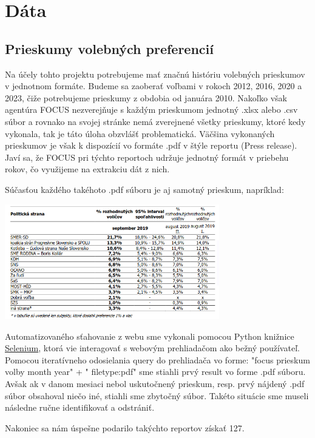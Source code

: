 \documentclass[main.tex]{subfiles}
\begin{document}
\section{Dáta}

\subsection{Prieskumy volebných preferencií}
Na účely tohto projektu potrebujeme mať značnú históriu volebných prieskumov v jednotnom formáte. Budeme sa zaoberať voľbami v rokoch 2012, 2016, 2020 a 2023, čiže potrebujeme prieskumy z obdobia od januára 2010.
Nakoľko však agentúra FOCUS nezverejňuje s každým prieskumom jednotný .xlsx alebo .csv súbor a rovnako na svojej stránke nemá zverejnené všetky prieskumy, ktoré kedy vykonala, tak je táto úloha obzvlášť problematická.
Väčšina vykonaných prieskumov je však k dispozícií vo formáte .pdf v štýle reportu (Press release). Javí sa, že FOCUS pri týchto reportoch udržuje jednotný formát v priebehu rokov, čo využijeme na extrakciu dát z nich.

Súčasťou každého takéhoto .pdf súboru je aj samotný prieskum, napríklad:

\begin{center}
\includegraphics[width=0.7\textwidth]{figs/priklad-focus-prieskumu.png}
\end{center}

Automatizovaného sťahovanie z webu sme vykonali pomocou Python knižnice \href{https://github.com/SeleniumHQ/Selenium}{Selenium}, ktorá vie interagovať s webovým prehliadačom ako bežný používateľ. Pomocou iteratívneho odosielania query do prehliadača vo forme: "focus prieskum volby {month} {year}" + " filetype:pdf" sme stiahli prvý result vo forme .pdf súboru. Avšak ak v danom mesiaci nebol uskutočnený prieskum, resp. prvý nájdený .pdf súbor obsahoval niečo iné, stiahli sme zbytočný súbor. Takéto situácie sme museli následne ručne identifikovať a odstrániť. 

Nakoniec sa nám úspešne podarilo takýchto reportov získať 127. 
\end{document}
